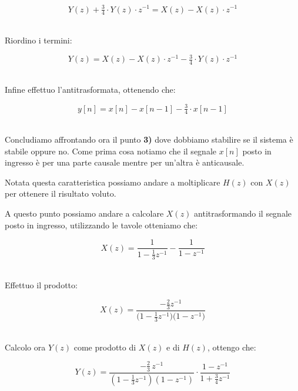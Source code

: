 \documentclass[../main.tex]{subfiles}
\begin{document}
\[ Y(z) + \tfrac{3}{4} \cdot Y(z) \cdot  z^{-1}  = X(z) - X(z) \cdot z^{-1}  \]\

Riordino i termini:

\[ Y(z) = X(z) - X(z) \cdot z^{-1} - \tfrac{3}{4} \cdot Y(z) \cdot  z^{-1} \]\

Infine effettuo l'antitrasformata, ottenendo che:

\[ y[n] = x[n] - x[n-1] - \tfrac{3}{4}\cdot x[n-1]  \]\


Concludiamo affrontando ora il punto \textbf{3)} dove dobbiamo stabilire se il sistema è stabile oppure no.
Come prima cosa notiamo che il segnale $x[n]$ posto in ingresso è per una parte causale mentre per un'altra è anticausale. 

Notata questa caratteristica possiamo andare a moltiplicare $H(z)$ con $X(z)$ per ottenere il risultato voluto.

A questo punto possiamo andare a calcolare $X(z)$ antitrasformando il segnale posto in ingresso, utilizzando le tavole otteniamo che:

\[ X(z) =  \frac{1}{1 - \tfrac{1}{3}z^{-1}} - \frac{1}{ 1 - z^{-1}} \]\

Effettuo il prodotto:

\[ X(z) =  \frac{-\tfrac{2}{3}z^{-1}}{\big(1 - \tfrac{1}{3}z^{-1}\big)\big(1 - z^{-1}\big)} \]\

Calcolo ora $Y(z)$ come prodotto di $X(z)$ e di $H(z)$, ottengo che:


\[ Y(z) =  \frac{ -\frac{2}{3} \, z^{-1} } { \left( 1 - \frac{1}{3} z^{-1} \right) \left( 1 - z^{-1} \right) } \cdot \frac{ 1 - z^{-1} }{ 1 + \frac{3}{4} z^{-1} } \]\
\end{document}
